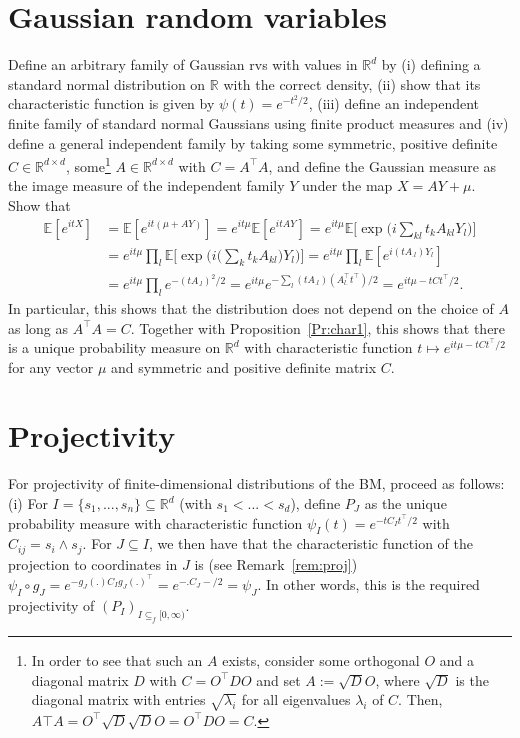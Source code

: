 \documentclass{article}
\theoremstyle{definition}
\theoremstyle{step} \newtheorem{step}{Step}
\begin{document}
\section{Gaussian random variables}
Define an arbitrary family of Gaussian rvs with values in $\mathbb
R^d$ by (i) defining a standard normal distribution on $\mathbb R$
with the correct density, (ii) show that its characteristic function
is given by $\psi(t) = e^{-t^2/2}$, (iii) define an independent finite
family of standard normal Gaussians using finite product measures and
(iv) define a general independent family by taking some symmetric,
positive definite $C \in \mathbb R^{d\times d}$, some\footnote{In
  order to see that such an $A$ exists, consider some orthogonal $O$
  and a diagonal matrix $D$ with $C = O^\top DO$ and set $A :=
  \sqrt{D} O$, where $\sqrt{D}$ is the diagonal matrix with entries
  $\sqrt{\lambda_i}$ for all eigenvalues $\lambda_i$ of $C$. Then,
  $A\top A = O^\top \sqrt{D}\sqrt{D} O = O^\top D O = C$.} $A \in
\mathbb R^{d\times d}$ with $C = A^\top A$, and define the Gaussian
measure as the image measure of the independent family $Y$ under the
map $X = A Y + \mu$. Show that
\begin{align*}
  \mathbb E[e^{itX}] & = \mathbb E[e^{it(\mu + AY)}] = e^{it\mu}
  \mathbb E[e^{itAY}] = e^{it\mu} \mathbb E\Big[\exp\Big(i \sum_{kl}
    t_k A_{kl} Y_l\Big)\Big] \\ & = e^{it\mu} \prod_{l} \mathbb
  E\Big[\exp\Big(i \big(\sum_{k} t_k A_{kl}\big) Y_l\Big)\Big] =
  e^{it\mu} \prod_{l} \mathbb E[e^{i (tA_{.l}) Y_l}] \\ & =
  e^{it\mu} \prod_{l} e^{-(tA_{.l})^2/2} = e^{it\mu} e^{-\sum_l
    (tA_{.l})(A^\top_{l.}t^\top)/2} = e^{it\mu -tCt^\top/2}.
\end{align*}
In particular, this shows that the distribution does not depend on the
choice of $A$ as long as $A^\top A = C$. Together with
Proposition~\ref{Pr:char1}, this shows that there is a unique
probability measure on $\mathbb R^d$ with characteristic function
$t\mapsto e^{it\mu -tCt^\top/2}$ for any vector $\mu$ and symmetric
and positive definite matrix $C$.

\section{Projectivity}\label{S:proj}
For projectivity of finite-dimensional distributions of the BM,
proceed as follows: (i) For $I = \{s_1,...,s_n\} \subseteq \mathbb
R^d$ (with $s_1 < ... < s_d$), define $P_J$ as the unique probability
measure with characteristic function $\psi_I(t) = e^{-tC_It^\top/2}$
with $C_{ij} = s_i \wedge s_j$. For $J\subseteq I$, we then have that
the characteristic function of the projection to coordinates in $J$ is
(see Remark~\ref{rem:proj}) $\psi_I \circ g_J = e^{- g_J(.)  C_I
  g_J(.)^\top} = e^{- . C_J -/2} = \psi_J$. In other words, this is
the required projectivity of $(P_I)_{I \subseteq_f [0,\infty)}$.
\end{document}

